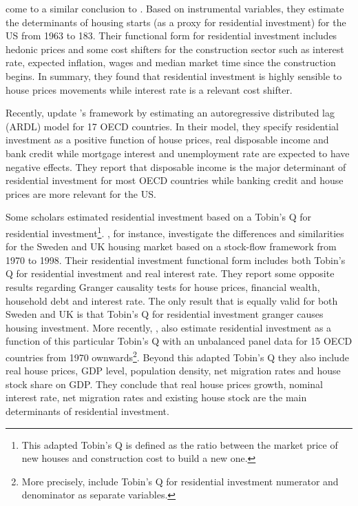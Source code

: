 \documentclass[12pt, a4paper]{article}
\begin{document}
\textcite{topel_1988_Housing} come to a similar conclusion to \textcite{poterba_tax_1984}.
Based on instrumental variables, they estimate the determinants of housing starts (as a proxy for residential investment) for the US from 1963 to 183.
Their functional form for residential investment includes hedonic prices and some cost shifters for the construction sector such as interest rate, expected inflation, wages and median market time since the construction begins.
In summary, they found that residential investment is highly sensible to house prices movements while interest rate is a relevant cost shifter.

Recently,  \textcite{arestis_residential_2015} update \citeauthor*{poterba_tax_1984}'s \citeyear{poterba_tax_1984} framework by estimating an autoregressive distributed lag (ARDL) model for 17 OECD countries.
In their model, they specify residential investment as a positive function of house prices, real disposable income and bank credit while mortgage interest and unemployment rate are expected to have negative effects.
They report that disposable income is the major determinant of residential investment for most OECD countries while banking credit and house prices are more relevant for the US.

Some scholars estimated residential investment based on a Tobin's Q for residential investment\footnote{This adapted Tobin's Q is defined as the ratio between the market price of new houses and construction cost to build a new one.}.
\textcite{barot_2002_House}, for instance, investigate the differences and similarities for the Sweden and UK housing market based on a stock-flow framework from 1970 to 1998.
Their residential investment functional form includes both Tobin's Q for residential investment and real interest rate.
They report some opposite results regarding Granger causality tests for house prices, financial wealth, household debt and interest rate.
The only result that is equally valid for both Sweden and UK is that Tobin's Q for residential investment  granger causes housing investment.
More recently, \textcite{kohlscheen_2018_Residential}, also estimate residential investment as a function of this particular Tobin's Q with an unbalanced panel data for 15 OECD countries from 1970 ownwards\footnote{More precisely, \textcite{kohlscheen_2018_Residential} include Tobin's Q for residential investment numerator and denominator as separate variables.}.
Beyond this adapted Tobin's Q they also include real house prices, GDP level, population density, net migration rates and house stock share on GDP.
They conclude that real house prices growth, nominal interest rate, net migration rates and existing house stock are the main determinants of residential investment.
\end{document}
